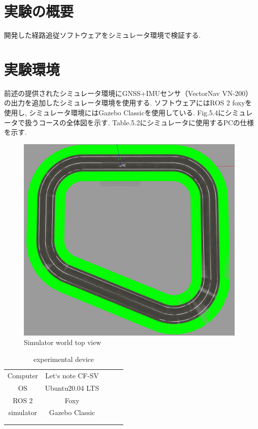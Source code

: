 \section{実験の概要}
開発した経路追従ソフトウェアをシミュレータ環境で検証する.

\section{実験環境}
前述の提供されたシミュレータ環境にGNSS+IMUセンサ（VectorNav VN-200）の出力を追加したシミュレータ環境を使用する.
ソフトウェアにはROS 2 foxyを使用し, シミュレータ環境にはGazebo Classicを使用している.
Fig.5.4にシミュレータで扱うコースの全体図を示す.
Table.5.2にシミュレータに使用するPCの仕様を示す.

\begin{figure}[H]
  \centering
 \includegraphics[keepaspectratio, scale=0.3]
      {images/topviewsim.png}
 \caption{Simulator world top view}
 \label{fig:simulator}
\end{figure}

\begin{table}[H]
  \centering
  \caption{experimental device}
  \begin{tabular}{cclll}
  \cline{1-2}
  Computer             & Let`s note CF-SV &  &  &  \\
  OS                   & Ubuntu20.04 LTS  &  &  &  \\
  ROS 2                & Foxy             &  &  &  \\
  simulator            & Gazebo Classic   &  &  &  \\
  \multicolumn{1}{l}{} &                  &  &  &  \\
  \multicolumn{1}{l}{} &                  &  &  & 
  \end{tabular}
\end{table}

